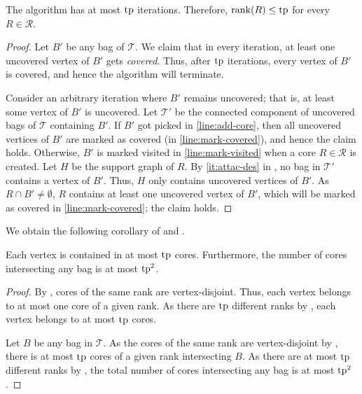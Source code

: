 \documentclass{theoretics}
\newcommand{\tp}{{\rm tp}}
\newcommand{\mt}{\mathcal{T}}
\newcommand{\rank}{\mathrm{rank}}
\def\coreSet{\mathcal{R}}
\def\core{R}
\begin{document}
\begin{lemma}\label{lem:numberiterations}
	The algorithm has at most $\tp$ iterations. Therefore, $\rank(\core) \leq \tp$ for every $\core \in \coreSet$.
\end{lemma}
\begin{proof}
	Let $B'$ be any bag of $\mt$. We claim that in every iteration, at least one uncovered vertex of $B'$ gets \emph{covered}. Thus, after $\tp$ iterations, every vertex of $B'$ is covered, and hence the algorithm will terminate.
	
	Consider an arbitrary iteration where $B'$ remains uncovered; that is, at least some vertex of $B'$ is uncovered. Let $\mt'$ be the connected component of uncovered bags of $\mt$ containing $B'$. If $B'$ got picked in \cref{line:add-core}, then all uncovered vertices of $B'$ are marked as covered (in \cref{line:mark-covered}), and hence the claim holds. Otherwise, $B'$ is marked visited in \cref{line:mark-visited} when a core $\core \in \coreSet$ is created. Let $H$ be the support graph of $\core$. By \cref{it:attac-des} in , no bag in $\mt'$ contains a vertex of $B'$. Thus, $H$ only contains uncovered vertices of $B'$. As $\core\cap B' \not=\emptyset$, $\core$ contains at least one uncovered vertex of $B'$, which will be marked as covered in \cref{line:mark-covered}; the claim holds.  
\end{proof}


We obtain the following corollary of  and .

\begin{corollary}\label{cor:core-bag-intersect} Each vertex is contained in at most $\tp$ cores. Furthermore, the number of cores intersecting any bag is at most $\tp^2$.
\end{corollary}
\begin{proof}
	By ,  cores of the same rank are vertex-disjoint. Thus, each vertex belongs to at most one core of a given rank. As there are $\tp$ different ranks by , each vertex belongs to at most $\tp$ cores. 
	
	Let $B$ be any bag in $\mt$. As the cores of the same rank are vertex-disjoint by , there is at most $\tp$ cores of a given rank intersecting $B$. As there are at most $\tp$ different ranks by  , the total number of cores intersecting any bag is at most $\tp^2$.
\end{proof}
\end{document}
